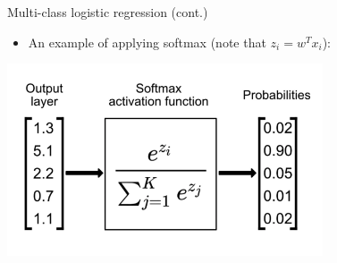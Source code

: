 \documentclass[serif, aspectratio=169]{beamer}
\begin{document}
\begin{frame}{Multi-class logistic regression (cont.)}
    \begin{itemize}
        \item An example of applying softmax (note that $z_i=w^Tx_i$):
    \end{itemize}
    \begin{center}
        \includegraphics[width=0.7\textwidth]{pic/softmax0.png}
       
    \end{center}
\end{frame}
\end{document}
